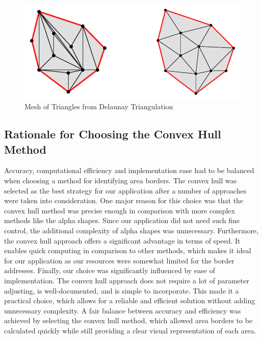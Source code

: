     \begin{figure} [H]
        \centering
        \includegraphics [width=.75\textwidth] {images/andreas/areaBorders/dtPic.png}
        \caption{Mesh of Triangles from Delaunay Triangulation \autocite{Andi:dtPic}}
    \end{figure}

    \subsection{Rationale for Choosing the Convex Hull Method}
    Accuracy, computational efficiency and implementation ease had to be balanced when choosing a method for identifying area borders. The convex hull was selected as the best strategy for our application after a number of approaches were taken into consideration. \newline
    One major reason for this choice was that the convex hull method was precise enough in comparison with more complex methods like the alpha shapes. Since our application did not need such fine control, the additional complexity of alpha shapes was unnecessary. \newline
    Furthermore, the convex hull approach offers a significant advantage in terms of speed. It enables quick computing in comparison to other methods, which makes it ideal for our application as our resources were somewhat limited for the border addresses. \newline
    Finally, our choice was significantly influenced by ease of implementation. The convex hull approach does not require a lot of parameter adjusting, is well-documented, and is simple to incorporate. This made it a practical choice, which allows for a reliable and efficient solution without adding unnecessary complexity. \newline
    A fair balance between accuracy and efficiency was achieved by selecting the convex hull method, which allowed area borders to be calculated quickly while still providing a clear visual representation of each area.

